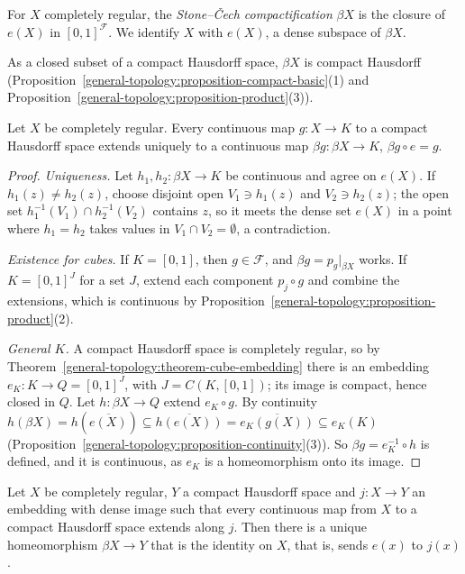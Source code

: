 \begin{definition}\label{general-topology:definition-stone-cech}
For $X$ completely regular, the \emph{Stone--\v{C}ech compactification} $\beta X$ is the closure of $e(X)$ in $[0, 1]^{\mathcal{F}}$. We identify $X$ with $e(X)$, a dense subspace of $\beta X$.
\end{definition}

As a closed subset of a compact Hausdorff space, $\beta X$ is compact Hausdorff (Proposition~\ref{general-topology:proposition-compact-basic}(1) and Proposition~\ref{general-topology:proposition-product}(3)).

\begin{theorem}\label{general-topology:theorem-stone-cech}
Let $X$ be completely regular. Every continuous map $g \colon X \to K$ to a compact Hausdorff space extends uniquely to a continuous map $\beta g \colon \beta X \to K$, $\beta g \circ e = g$.
\end{theorem}

\begin{proof}
\emph{Uniqueness.} Let $h_1, h_2 \colon \beta X \to K$ be continuous and agree on $e(X)$. If $h_1(z) \neq h_2(z)$, choose disjoint open $V_1 \ni h_1(z)$ and $V_2 \ni h_2(z)$; the open set
$h_1^{-1}(V_1) \cap h_2^{-1}(V_2)$ contains $z$, so it meets the dense set $e(X)$ in a point where $h_1 = h_2$ takes values in $V_1 \cap V_2 = \emptyset$, a contradiction.

\emph{Existence for cubes.} If $K = [0, 1]$, then $g \in \mathcal{F}$, and $\beta g = p_g|_{\beta X}$ works. If $K = [0, 1]^J$ for a set $J$, extend each component $p_j \circ g$ and combine the extensions,
which is continuous by Proposition~\ref{general-topology:proposition-product}(2).

\emph{General $K$.} A compact Hausdorff space is completely regular, so by Theorem~\ref{general-topology:theorem-cube-embedding} there is an embedding $e_K \colon K \to Q = [0, 1]^{J}$, with
$J = C(K, [0, 1])$; its image is compact, hence closed in $Q$. Let $h \colon \beta X \to Q$ extend $e_K \circ g$. By continuity
$h(\beta X) = h(\overline{e(X)}) \subseteq \overline{h(e(X))} = \overline{e_K(g(X))} \subseteq e_K(K)$ (Proposition~\ref{general-topology:proposition-continuity}(3)). So $\beta g = e_K^{-1} \circ h$ is defined, and it is continuous,
as $e_K$ is a homeomorphism onto its image.
\end{proof}

\begin{corollary}\label{general-topology:corollary-stone-cech-unique}
Let $X$ be completely regular, $Y$ a compact Hausdorff space and $j \colon X \to Y$ an embedding with dense image such that every continuous map from $X$ to a compact Hausdorff space extends along $j$. Then there
is a unique homeomorphism $\beta X \to Y$ that is the identity on $X$, that is, sends $e(x)$ to $j(x)$.
\end{corollary}


